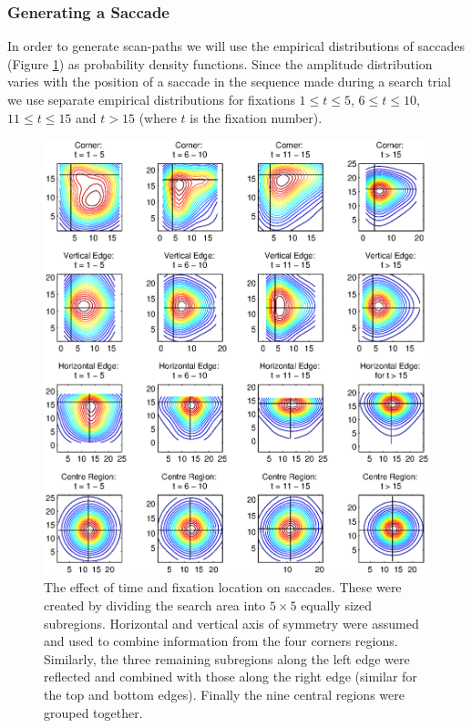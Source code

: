 \subsubsection{Generating a Saccade}
In order to generate scan-paths we will use the empirical distributions of saccades (Figure \ref{fig:spatialsaccadestats}) as probability density functions. Since the amplitude distribution varies with the position of a saccade in the sequence made during a search trial we use separate empirical distributions for fixations $1\leq t\leq 5$, $6\leq t\leq 10$, $11\leq t \leq 15$ and $t>15$ (where $t$ is the fixation number). %

\begin{figure}
	\centering
		\includegraphics[width=14cm]{figures/saccadesbyposition2.eps}
		\caption{The effect of time and fixation location on saccades. These were created by dividing the search area into $5\times 5$ equally sized subregions. Horizontal and vertical axis of symmetry were assumed and used to combine information from the four corners regions. Similarly, the three remaining subregions along the left edge were reflected and combined with those along the right edge (similar for the top and bottom edges). Finally the nine central regions were grouped together.}
	\label{fig:spatialsaccadestats}
\end{figure}


